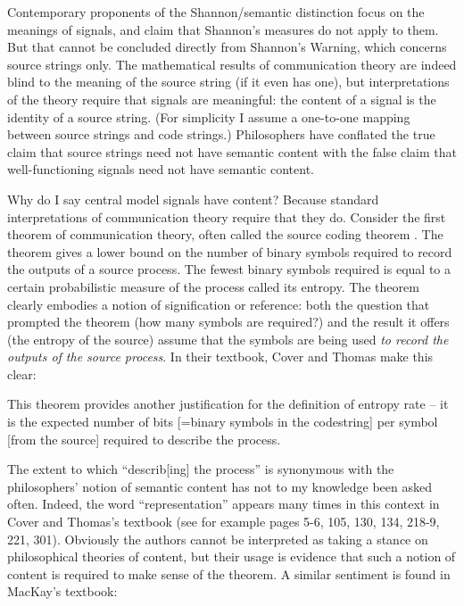 Contemporary proponents of the Shannon/semantic distinction focus on the meanings of signals, and claim that Shannon's measures do not apply to them.
But that cannot be concluded directly from {\sc Shannon's Warning}, which concerns source strings only.
The mathematical results of communication theory are indeed blind to the meaning of the source string (if it even has one), but interpretations of the theory require that signals are meaningful: the content of a signal is the identity of a source string.
(For simplicity I assume a one-to-one mapping between source strings and code strings.)
Philosophers have conflated the true claim that source strings need not have semantic content with the false claim that well-functioning signals need not have semantic content.

Why do I say central model signals have content?
Because standard interpretations of communication theory require that they do.
Consider the first theorem of communication theory, often called the source coding theorem \citep[$\S$5]{cover2006elements} \citep[$\S$4]{mackay2003information}.
The theorem gives a lower bound on the number of binary symbols required to record the outputs of a source process.
The fewest binary symbols required is equal to a certain probabilistic measure of the process called its entropy.
The theorem clearly embodies a notion of signification or reference: both the question that prompted the theorem (how many symbols are required?) and the result it offers (the entropy of the source) assume that the symbols are being used \emph{to record the outputs of the source process}.
In their textbook, Cover and Thomas make this clear:

\begin{myquote}
This theorem provides another justification for the definition of entropy rate -- it is the expected number of bits [=binary symbols in the codestring] per symbol [from the source] required to describe the process.
\par\hspace*{\fill}\citet[115]{cover2006elements}
\end{myquote}

\noindent The extent to which ``describ[ing] the process'' is synonymous with the philosophers' notion of semantic content has not to my knowledge been asked often.
Indeed, the word ``representation'' appears many times in this context in Cover and Thomas's textbook (see for example pages 5-6, 105, 130, 134, 218-9, 221, 301).
Obviously the authors cannot be interpreted as taking a stance on philosophical theories of content, but their usage is evidence that such a notion of content is required to make sense of the theorem.
A similar sentiment is found in MacKay's textbook:


